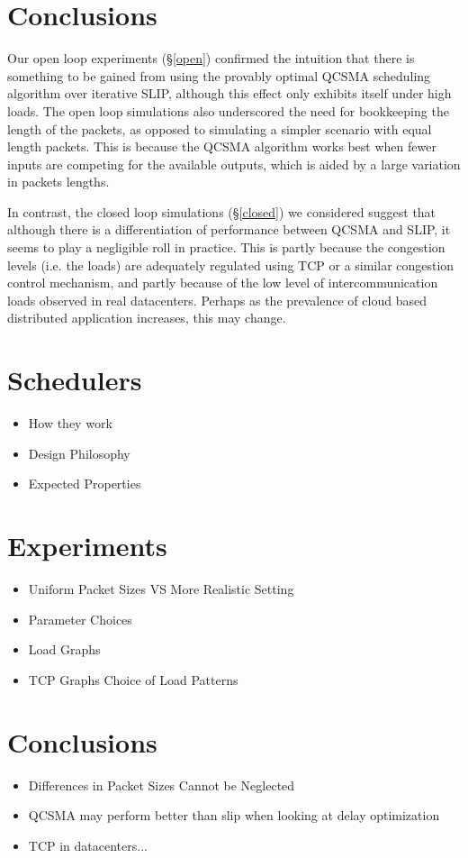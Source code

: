 \documentclass{IEEEtran}%
\begin{document}
\section{Conclusions}

Our open loop experiments (\S\ref{open}) confirmed the intuition that there is something to be gained from using the provably optimal QCSMA scheduling algorithm over iterative SLIP, although this effect only exhibits itself under high loads.  The open loop simulations also underscored the need for bookkeeping the length of the packets, as opposed to simulating a simpler scenario with equal length packets.  This is because the QCSMA algorithm works best when fewer inputs are competing for the available outputs, which is aided by a large variation in packets lengths.

In contrast, the closed loop simulations (\S \ref{closed}) we considered suggest that although there is a differentiation of performance between QCSMA and SLIP, it seems to play a negligible roll in practice.  This is partly because the congestion levels (i.e. the loads) are adequately regulated using TCP or a similar congestion control mechanism, and partly because of the low level of intercommunication loads observed in real datacenters.  Perhaps as the prevalence of cloud based distributed application increases, this may change.

\section{Schedulers}
\begin{itemize}
\item How they work
\item Design Philosophy
\item Expected Properties
\end{itemize}

\section{Experiments}
\begin{itemize}
\item Uniform Packet Sizes VS More Realistic Setting
\item Parameter Choices
\item Load Graphs
\item TCP Graphs Choice of Load Patterns
\end{itemize}

\section{Conclusions}
\begin{itemize}
\item Differences in Packet Sizes Cannot be Neglected
\item QCSMA may perform better than slip when looking at delay optimization
\item TCP in datacenters...
\end{itemize}
\end{document}
